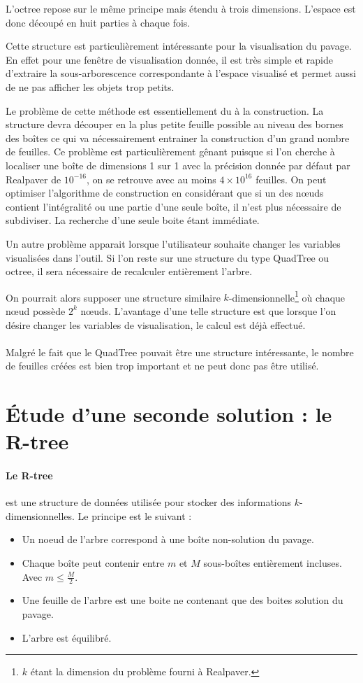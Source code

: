 L'octree repose sur le même principe mais étendu à trois dimensions. L'espace est donc découpé en huit parties à chaque fois.

Cette structure est particulièrement intéressante pour la visualisation du pavage. En effet pour une fenêtre de visualisation donnée, il est très simple et rapide d'extraire la sous-arborescence correspondante à l'espace visualisé et permet aussi de ne pas afficher les objets trop petits.

Le problème de cette méthode est essentiellement du à la construction. La structure devra découper en la plus petite feuille possible au niveau des bornes des boîtes ce qui va nécessairement entrainer la construction d'un grand nombre de feuilles. Ce problème est particulièrement gênant puisque si l'on cherche à localiser une boîte de dimensions 1 sur 1 avec la précision donnée par défaut par Realpaver de $10^{-16}$, on se retrouve avec au moins $4 \times 10^{16}$ feuilles. On peut optimiser l'algorithme de construction en considérant que si un des nœuds contient l'intégralité ou une partie d'une seule boîte, il n'est plus nécessaire de subdiviser. La recherche d'une seule boite étant immédiate.

Un autre problème apparait lorsque l'utilisateur souhaite changer les variables visualisées dans l'outil. Si l'on reste sur une structure du type QuadTree ou octree, il sera nécessaire de recalculer entièrement l'arbre.

On pourrait alors supposer une structure similaire $k$-dimensionnelle\footnote{$k$ étant la dimension du problème fourni à Realpaver.} où chaque nœud possède $2^k$ nœuds. L'avantage d'une telle structure est que lorsque l'on désire changer les variables de visualisation, le calcul est déjà effectué.

\paragraph{} Malgré le fait que le QuadTree pouvait être une structure intéressante, le nombre de feuilles créées est bien trop important et ne peut donc pas être utilisé.

\section{\'Etude d'une seconde solution : le R-tree}
\paragraph{Le R-tree} est une structure de données utilisée pour stocker des informations $k$-dimensionnelles. Le principe est le suivant :
\begin{itemize}
 \item Un noeud de l'arbre correspond à une boîte non-solution du pavage.
 \item Chaque boîte peut contenir entre $m$ et $M$ sous-boîtes entièrement incluses. Avec $m\leq \frac{M}{2}$.
 \item Une feuille de l'arbre est une boite ne contenant que des boites solution du pavage.
 \item L'arbre est équilibré.
\end{itemize}

